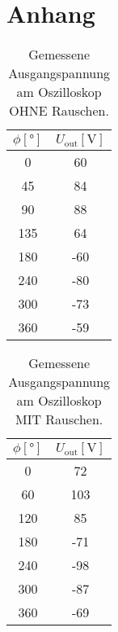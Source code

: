 \newpage
\section{Anhang}


\begin{table}
    \centering
    \caption{Gemessene Ausgangspannung am Oszilloskop OHNE Rauschen.}
    \label{tab:1}
    \begin{tabular}{c c}
        \toprule
        $\phi [\si{\degree}]$ & $U_{\text{out}} [\si{\volt}]$ \\
        \midrule
        0       & 60 \\
        45      & 84 \\
        90      & 88 \\
        135     & 64 \\
        180     & -60 \\
        240     & -80 \\
        300     & -73 \\
        360     & -59 \\
    \end{tabular}
\end{table}

\begin{table}
    \centering
    \caption{Gemessene Ausgangspannung am Oszilloskop MIT Rauschen.}
    \label{tab:2}
    \begin{tabular}{c c}
        \toprule
        $\phi [\si{\degree}]$ & $U_{\text{out}} [\si{\volt}]$ \\
        \midrule
        0      &  72    \\
        60     &  103   \\
        120    &  85    \\
        180    & -71    \\
        240    & -98    \\
        300    & -87    \\
        360    & -69    \\              
        \end{tabular}
\end{table}

